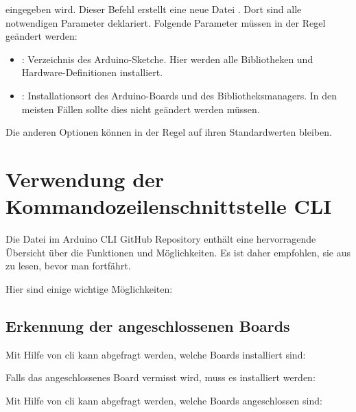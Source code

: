 \medskip

eingegeben wird. Dieser Befehl erstellt eine neue Datei . Dort sind alle notwendigen Parameter deklariert. Folgende Parameter müssen in der Regel geändert werden:

\begin{itemize}
	\item {}: Verzeichnis des Arduino-Sketche. Hier werden alle Bibliotheken und Hardware-Definitionen installiert.
	\item {}:  Installationsort des Arduino-Boards und des Bibliotheksmanagers. In den meisten Fällen sollte dies nicht geändert werden müssen.
\end{itemize}


Die anderen Optionen können in der Regel auf ihren Standardwerten bleiben.




\section{Verwendung der Kommandozeilenschnittstelle CLI}

Die Datei  im Arduino CLI GitHub Repository enthält eine hervorragende Übersicht über die Funktionen und Möglichkeiten.\cite{ArduinoCLIGit:2022} 
Es ist daher empfohlen, sie aus zu lesen, bevor man  fortfährt. 

\medskip

Hier sind einige wichtige Möglichkeiten:


\subsection{Erkennung der angeschlossenen Boards}




Mit Hilfe von \ac{cli} kann abgefragt werden, welche Boards installiert sind:

\medskip



\medskip

Falls das angeschlossenes Board vermisst wird, muss es installiert werden:

\medskip


\medskip

Mit Hilfe von \ac{cli} kann abgefragt werden, welche Boards angeschlossen sind:

